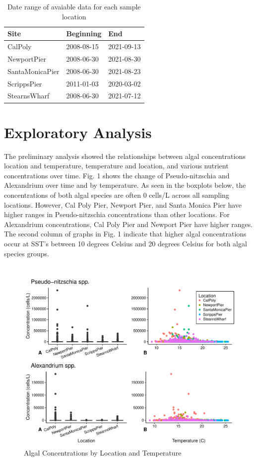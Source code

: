 \documentclass[
  12pt,
]{article}
\begin{document}
\begin{longtable}[t]{lll}
\caption{\label{tab:prelim data analysis}Date range of avaiable data for each sample location}\\
\toprule
Site & Beginning & End\\
\midrule
CalPoly & 2008-08-15 & 2021-09-13\\
NewportPier & 2008-06-30 & 2021-08-30\\
SantaMonicaPier & 2008-06-30 & 2021-08-23\\
ScrippsPier & 2011-01-03 & 2020-03-02\\
StearnsWharf & 2008-06-30 & 2021-07-12\\
\bottomrule
\end{longtable}

\newpage

\hypertarget{exploratory-analysis}{%
\section{Exploratory Analysis}\label{exploratory-analysis}}

The preliminary analysis showed the relationships between algal
concentrations location and temperature, temperature and location, and
various nutrient concentrations over time. Fig. 1 shows the change of
Pseudo-nitzschia and Alexandrium over time and by temperature. As seen
in the boxplots below, the concentrations of both algal species are
often 0 cells/L across all sampling locations. However, Cal Poly Pier,
Newport Pier, and Santa Monica Pier have higher ranges in
Pseudo-nitzschia concentrations than other locations. For Alexandrium
concentrations, Cal Poly Pier and Newport Pier have higher ranges. The
second column of graphs in Fig. 1 indicate that higher algal
concentrations occur at SST's between 10 degrees Celsius and 20 degrees
Celsius for both algal species groups.

\begin{figure}
\centering
\includegraphics{Habs_Final_Report_files/figure-latex/Exploratory Analysis-1.pdf}
\caption{Algal Concentrations by Location and Temperature}
\end{figure}
\end{document}
